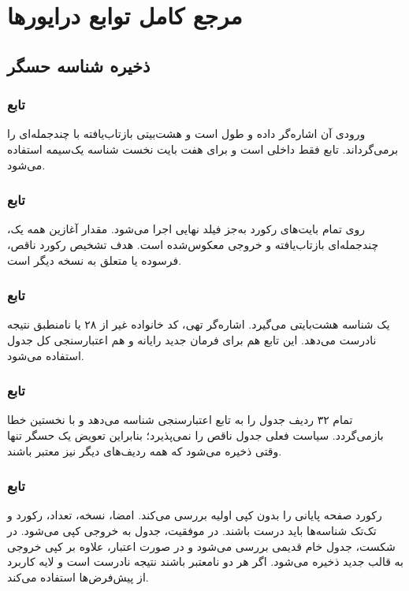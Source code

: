 \chapter{مرجع کامل توابع درایورها}

\section{ذخیره شناسه حسگر}

\subsection{تابع }
ورودی آن اشاره‌گر داده و طول است و
هشت‌بیتی بازتاب‌یافته با چندجمله‌ای
را برمی‌گرداند. تابع فقط داخلی است و برای هفت بایت نخست شناسه یک‌سیمه استفاده می‌شود.

\subsection{تابع }
روی تمام بایت‌های رکورد به‌جز فیلد
نهایی اجرا می‌شود. مقدار آغازین همه یک، چندجمله‌ای بازتاب‌یافته
و خروجی معکوس‌شده است. هدف تشخیص رکورد ناقص، فرسوده یا متعلق به نسخه دیگر است.

\subsection{تابع }
یک شناسه هشت‌بایتی می‌گیرد. اشاره‌گر تهی، کد خانواده غیر از ۲۸ یا
نامنطبق نتیجه نادرست می‌دهد. این تابع هم برای فرمان جدید رایانه و هم اعتبارسنجی کل جدول استفاده می‌شود.

\subsection{تابع }
تمام ۳۲ ردیف جدول را به تابع اعتبارسنجی شناسه می‌دهد و با نخستین خطا بازمی‌گردد. سیاست فعلی جدول ناقص را نمی‌پذیرد؛ بنابراین تعویض یک حسگر تنها وقتی ذخیره می‌شود که همه ردیف‌های دیگر نیز معتبر باشند.

\subsection{تابع }
رکورد صفحه پایانی
را بدون کپی اولیه بررسی می‌کند. امضا، نسخه، تعداد،
رکورد و
تک‌تک شناسه‌ها باید درست باشند. در موفقیت، جدول به خروجی کپی می‌شود. در شکست، جدول خام قدیمی بررسی می‌شود و در صورت اعتبار، علاوه بر کپی خروجی به قالب جدید ذخیره می‌شود. اگر هر دو نامعتبر باشند نتیجه نادرست است و لایه کاربرد از پیش‌فرض‌ها استفاده می‌کند.


